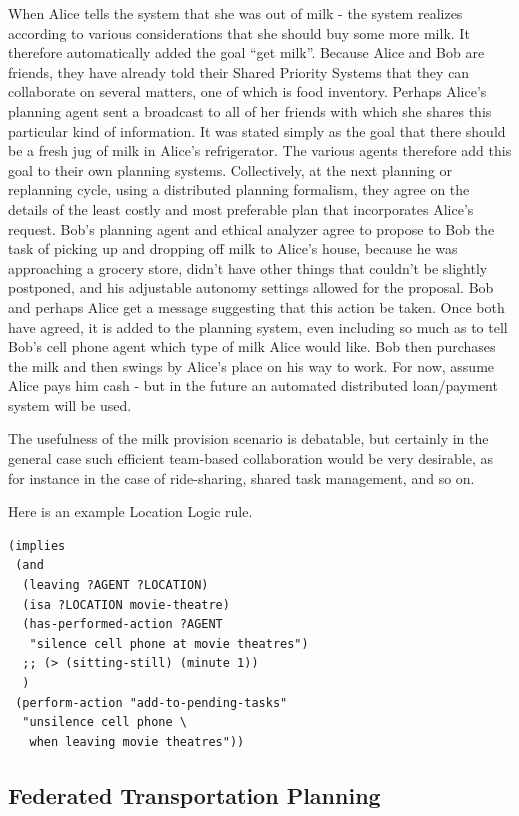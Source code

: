 \documentclass[letterpaper]{article}
\begin{document}
When Alice tells the system that she was out of milk - the system
realizes according to various considerations that she should buy some
more milk.  It therefore automatically added the goal ``get milk''.
Because Alice and Bob are friends, they have already told their Shared
Priority Systems that they can collaborate on several matters, one of
which is food inventory.  Perhaps Alice's planning agent sent a
broadcast to all of her friends with which she shares this particular
kind of information.  It was stated simply as the goal that there
should be a fresh jug of milk in Alice's refrigerator.  The various
agents therefore add this goal to their own planning systems.
Collectively, at the next planning or replanning cycle, using a
distributed planning formalism, they agree on the details of the least
costly and most preferable plan that incorporates Alice's request.
Bob's planning agent and ethical analyzer agree to propose to Bob the
task of picking up and dropping off milk to Alice's house, because he
was approaching a grocery store, didn't have other things that
couldn't be slightly postponed, and his adjustable autonomy settings
allowed for the proposal.  Bob and perhaps Alice get a message
suggesting that this action be taken.  Once both have agreed, it is
added to the planning system, even including so much as to tell Bob's
cell phone agent which type of milk Alice would like.  Bob then
purchases the milk and then swings by Alice's place on his way to
work.  For now, assume Alice pays him cash - but in the future an
automated distributed loan/payment system will be used.

The usefulness of the milk provision scenario is debatable, but
certainly in the general case such efficient team-based collaboration
would be very desirable, as for instance in the case of ride-sharing,
shared task management, and so on.

Here is an example Location Logic rule.

\begin{footnotesize}
\begin{verbatim}
(implies
 (and
  (leaving ?AGENT ?LOCATION)
  (isa ?LOCATION movie-theatre)
  (has-performed-action ?AGENT
   "silence cell phone at movie theatres")
  ;; (> (sitting-still) (minute 1))
  )
 (perform-action "add-to-pending-tasks"
  "unsilence cell phone \
   when leaving movie theatres"))
\end{verbatim}
\end{footnotesize}

\subsection{Federated Transportation Planning}
\end{document}

